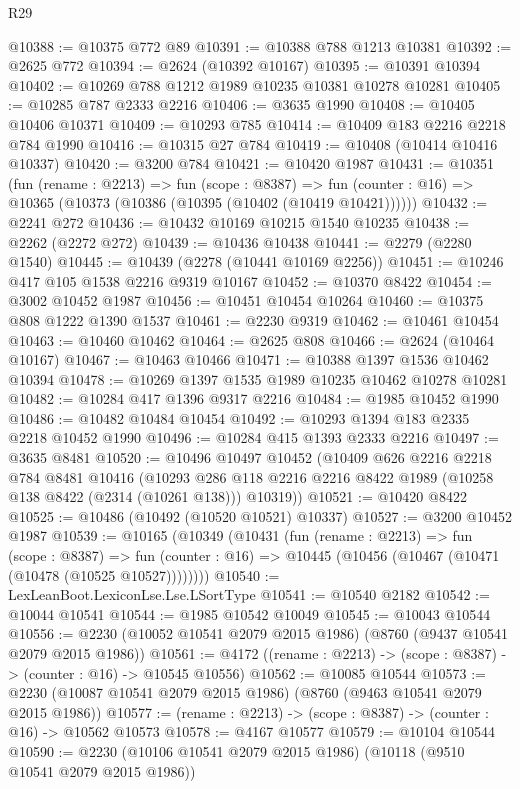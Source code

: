 \begin{lexlean}{R29}
\begin{coremodule}
@10388 := @10375 @772 @89
@10391 := @10388 @788 @1213 @10381
@10392 := @2625 @772
@10394 := @2624 (@10392 @10167)
@10395 := @10391 @10394
@10402 := @10269 @788 @1212 @1989 @10235 @10381 @10278 @10281
@10405 := @10285 @787 @2333 @2216
@10406 := @3635 @1990
@10408 := @10405 @10406 @10371
@10409 := @10293 @785
@10414 := @10409 @183 @2216 @2218 @784 @1990
@10416 := @10315 @27 @784
@10419 := @10408 (@10414 @10416 @10337)
@10420 := @3200 @784
@10421 := @10420 @1987
@10431 := @10351
    (fun (rename : @2213) =>
    fun (scope : @8387) =>
    fun (counter : @16) => @10365 (@10373 (@10386 (@10395 (@10402 (@10419 @10421))))))
@10432 := @2241 @272
@10436 := @10432 @10169 @10215 @1540 @10235
@10438 := @2262 (@2272 @272)
@10439 := @10436 @10438
@10441 := @2279 (@2280 @1540)
@10445 := @10439 (@2278 (@10441 @10169 @2256))
@10451 := @10246 @417 @105 @1538 @2216 @9319 @10167
@10452 := @10370 @8422
@10454 := @3002 @10452 @1987
@10456 := @10451 @10454 @10264
@10460 := @10375 @808 @1222 @1390 @1537
@10461 := @2230 @9319
@10462 := @10461 @10454
@10463 := @10460 @10462
@10464 := @2625 @808
@10466 := @2624 (@10464 @10167)
@10467 := @10463 @10466
@10471 := @10388 @1397 @1536 @10462 @10394
@10478 := @10269 @1397 @1535 @1989 @10235 @10462 @10278 @10281
@10482 := @10284 @417 @1396 @9317 @2216
@10484 := @1985 @10452 @1990
@10486 := @10482 @10484 @10454
@10492 := @10293 @1394 @183 @2335 @2218 @10452 @1990
@10496 := @10284 @415 @1393 @2333 @2216
@10497 := @3635 @8481
@10520 := @10496
    @10497
    @10452
    (@10409
      @626
      @2216
      @2218
      @784
      @8481
      @10416
      (@10293 @286 @118 @2216 @2216 @8422 @1989 (@10258 @138 @8422 (@2314 (@10261 @138))) @10319))
@10521 := @10420 @8422
@10525 := @10486 (@10492 (@10520 @10521) @10337)
@10527 := @3200 @10452 @1987
@10539 := @10165
    (@10349
      (@10431
        (fun (rename : @2213) =>
        fun (scope : @8387) =>
        fun (counter : @16) => @10445 (@10456 (@10467 (@10471 (@10478 (@10525 @10527))))))))
@10540 := LexLeanBoot.LexiconLse.Lse.LSortType
@10541 := @10540 @2182
@10542 := @10044 @10541
@10544 := @1985 @10542 @10049
@10545 := @10043 @10544
@10556 := @2230 (@10052 @10541 @2079 @2015 @1986) (@8760 (@9437 @10541 @2079 @2015 @1986))
@10561 := @4172 ((rename : @2213) -> (scope : @8387) -> (counter : @16) -> @10545 @10556)
@10562 := @10085 @10544
@10573 := @2230 (@10087 @10541 @2079 @2015 @1986) (@8760 (@9463 @10541 @2079 @2015 @1986))
@10577 := (rename : @2213) -> (scope : @8387) -> (counter : @16) -> @10562 @10573
@10578 := @4167 @10577
@10579 := @10104 @10544
@10590 := @2230 (@10106 @10541 @2079 @2015 @1986) (@10118 (@9510 @10541 @2079 @2015 @1986))

\end{coremodule}
\end{lexlean}

